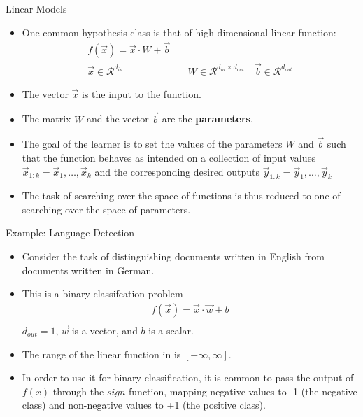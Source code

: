 \documentclass[handout]{beamer}
\begin{document}
\begin{frame}{Linear Models}
\begin{scriptsize}
\begin{itemize}
\item One common hypothesis class is that of high-dimensional linear function:
\begin{equation}
\begin{split}
f(\vec{x}) = \vec{x} \cdot W + \vec{b}\\
\vec{x} \in  \mathcal{R}^{d_{in}} & \quad W \in  \mathcal{R}^{d_{in}\times d_{out}} \quad \vec{b} \in  \mathcal{R}^{d_{out}}
\end{split}
\end{equation}
\item The vector $\vec{x}$ is the input to the function.
\item The matrix $W$ and the vector $\vec{b}$ are the \textbf{parameters}.

\item The goal of the learner is to set the values of the parameters $W$ and $\vec{b}$ such that the function behaves as intended on a collection of input values $\vec{x}_{1:k} = \vec{x}_1,\dots,\vec{x}_k$ and the corresponding desired outputs $\vec{y}_{1:k} = \vec{y}_1,\dots,\vec{y}_k$

\item The task of searching over the space of functions is thus reduced to one of searching over the space of parameters. \cite{goldberg2017neural}

\end{itemize}


\end{scriptsize}
\end{frame}


\begin{frame}{Example: Language Detection}
\begin{scriptsize}
\begin{itemize}
\item Consider the task of distinguishing documents written in English from documents written in German.
\item This is a binary classifcation problem 
\begin{equation}
\begin{split}
f(\vec{x}) = \vec{x} \cdot \vec{w} + b\\
\end{split}
\end{equation}
 $d_{out}=1$, $\vec{w}$ is a vector, and $b$ is a scalar. 

 \item The range of the linear function in is $[-\infty,\infty]$.
 \item In order to use it for binary classification, it is common to pass the output of $f(x)$ through the $sign$ function, mapping negative values to -1 (the negative class) and non-negative values to +1 (the positive class).
\end{itemize}


\end{scriptsize}
\end{frame}
\end{document}
